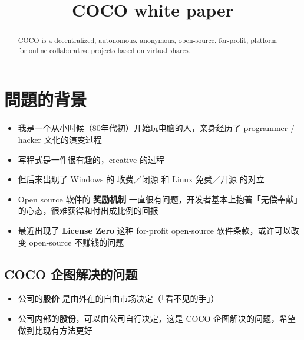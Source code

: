 \documentclass[12pt, orivec]{article}
\title{\color{blue} COCO white paper}
\newcommand{\cc}[2]{#1}
\newcommand{\cc}[2]{#2}
\begin{document}
\setlength{\parindent}{0pt}
\setlength{\parskip}{2.8ex plus0.8ex minus0.8ex}

\maketitle

\begin{abstract}
COCO is a decentralized, autonomous, anonymous, open-source, for-profit, platform for online collaborative projects based on virtual shares.
\end{abstract}

\dosecttoc
\tableofcontents

\secttoc
\section{\cc{問題的背景}{The problem's context}}

\begin{itemize}
	\item \cc{我是一个从小时候（80年代初）开始玩电脑的人，亲身经历了 programmer / hacker 文化的演变过程}
	{}
	
	\item \cc{写程式是一件很有趣的，creative 的过程}
	{}
	
	\item \cc{但后来出现了 Windows 的 收费／闭源 和 Linux 免费／开源 的对立}
	{}
	
	\item \cc{Open source 软件的 \textbf{奖励机制} 一直很有问题，开发者基本上抱著「无偿奉献」的心态，很难获得和付出成比例的回报}
	{}
	
	\item \cc{最近出现了 \textbf{License Zero} 这种 for-profit open-source 软件条款，或许可以改变 open-source 不赚钱的问题}
	{}
\end{itemize}

\secttoc
\subsection{\cc{COCO 企图解决的问题}{What does COCO try to solve?}}

\begin{itemize}
	\item \cc{公司的\textbf{股价} 是由外在的自由市场决定（「看不见的手」）}
	{A company's \textbf{stock prices} are determined externally by the free-market (``invisible hand'')}

	\item \cc{公司内部的\textbf{股份}，可以由公司自行决定，这是 COCO 企图解决的问题，希望做到比现有方法更好}
	{How the company distributes its \textbf{shares} are decided internally;  This is where COCO tries to innovate}
\end{itemize}
\end{document}

